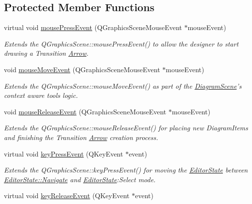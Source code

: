 \subsection*{Protected Member Functions}
\begin{DoxyCompactItemize}
\item 
virtual void \hyperlink{class_diagram_scene_a56249136dab559afa4f840a5c92acf73}{mouse\-Press\-Event} (Q\-Graphics\-Scene\-Mouse\-Event $\ast$mouse\-Event)
\begin{DoxyCompactList}\small\item\em Extends the Q\-Graphics\-Scene\-::mouse\-Press\-Event() to allow the designer to start drawing a Transition \hyperlink{class_arrow}{Arrow}. \end{DoxyCompactList}\item 
void \hyperlink{class_diagram_scene_a4c0f6af69a806c55da083a110a4eb820}{mouse\-Move\-Event} (Q\-Graphics\-Scene\-Mouse\-Event $\ast$mouse\-Event)
\begin{DoxyCompactList}\small\item\em Extends the Q\-Graphics\-Scene\-::mouse\-Move\-Event() as part of the \hyperlink{class_diagram_scene}{Diagram\-Scene}'s context aware tools logic. \end{DoxyCompactList}\item 
void \hyperlink{class_diagram_scene_a361512439a7cf2bcd0388c78eb1bb301}{mouse\-Release\-Event} (Q\-Graphics\-Scene\-Mouse\-Event $\ast$mouse\-Event)
\begin{DoxyCompactList}\small\item\em Extends the Q\-Graphics\-Scene\-::mouse\-Release\-Event() for placing new Diagram\-Items and finishing the Transition \hyperlink{class_arrow}{Arrow} creation process. \end{DoxyCompactList}\item 
virtual void \hyperlink{class_diagram_scene_a17a8c291a5140207c913c4bb9e2969f0}{key\-Press\-Event} (Q\-Key\-Event $\ast$event)
\begin{DoxyCompactList}\small\item\em Extends the Q\-Graphics\-Scene\-::key\-Press\-Event() for moving the \hyperlink{class_editor_state}{Editor\-State} between \hyperlink{class_editor_state_a30123e595784b2228edc2a0c2b46ab28a3ba8f119a9df84447a32145998ec62dd}{Editor\-State\-::\-Navigate} and \hyperlink{class_editor_state}{Editor\-State}\-:Select mode. \end{DoxyCompactList}\item 
virtual void \hyperlink{class_diagram_scene_ae797c572d7c9a89ed6d5207497ebd879}{key\-Release\-Event} (Q\-Key\-Event $\ast$event)

\end{DoxyCompactItemize}
